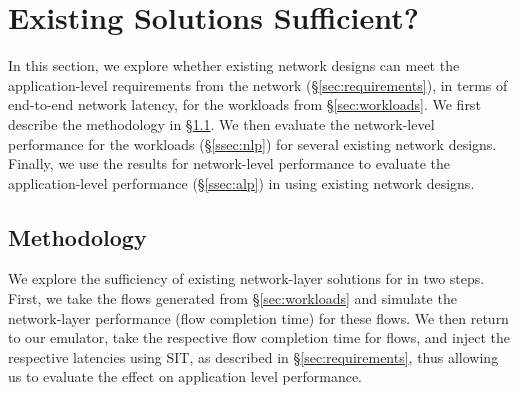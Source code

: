 \section{Existing Solutions Sufficient?}
\label{sec:existing}
In this section, we explore whether existing network designs can meet the application-level requirements from the network (\S\ref{sec:requirements}), in terms of end-to-end network latency, for the workloads from \S\ref{sec:workloads}. We first describe the methodology in \S\ref{ssec:ssmethod}. We then evaluate the network-level performance for the workloads (\S\ref{ssec:nlp}) for several existing network designs. Finally, we use the results for network-level performance to evaluate the application-level performance (\S\ref{ssec:alp}) in \dis using existing network designs. 

%
\subsection{Methodology}
\label{ssec:ssmethod}
We explore the sufficiency of existing network-layer solutions for \dis in two steps. First, we take the flows generated from \S\ref{sec:workloads} and simulate the network-layer performance (flow completion time) for these flows. We then return to our emulator, take the respective flow completion time for flows, and inject the respective latencies using SIT, as described in \S\ref{sec:requirements}, thus allowing us to evaluate the effect on application level performance. 

